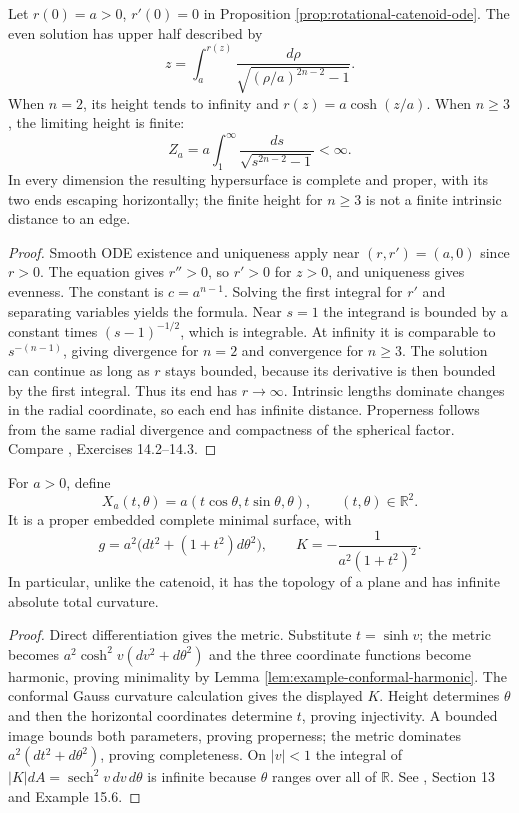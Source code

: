 \begin{example}\label{ex:higher-catenoid-height}
Let $r(0)=a>0$, $r'(0)=0$ in Proposition \ref{prop:rotational-catenoid-ode}. The even solution has upper half described by
\[
 z=\int_a^{r(z)}\frac{d\rho}{\sqrt{(\rho/a)^{2n-2}-1}}.
\]
When $n=2$, its height tends to infinity and $r(z)=a\cosh(z/a)$. When $n\geq3$, the limiting height is finite:
\[
 Z_a=a\int_1^\infty\frac{ds}{\sqrt{s^{2n-2}-1}}<\infty.
\]
In every dimension the resulting hypersurface is complete and proper, with its two ends escaping horizontally; the finite height for $n\geq3$ is not a finite intrinsic distance to an edge.
\end{example}
\begin{proof}
Smooth ODE existence and uniqueness apply near $(r,r')=(a,0)$ since $r>0$. The equation gives $r''>0$, so $r'>0$ for $z>0$, and uniqueness gives evenness. The constant is $c=a^{n-1}$. Solving the first integral for $r'$ and separating variables yields the formula. Near $s=1$ the integrand is bounded by a constant times $(s-1)^{-1/2}$, which is integrable. At infinity it is comparable to $s^{-(n-1)}$, giving divergence for $n=2$ and convergence for $n\geq3$. The solution can continue as long as $r$ stays bounded, because its derivative is then bounded by the first integral. Thus its end has $r\to\infty$. Intrinsic lengths dominate changes in the radial coordinate, so each end has infinite distance. Properness follows from the same radial divergence and compactness of the spherical factor. Compare \cite{ChMin}, Exercises 14.2--14.3.
\end{proof}

\begin{example}\label{ex:explicit-helicoid}
For $a>0$, define
\[
 X_a(t,\theta)=a(t\cos\theta,t\sin\theta,\theta),\qquad (t,\theta)\in\mathbb R^2.
\]
It is a proper embedded complete minimal surface, with
\[
 g=a^2\bigl(dt^2+(1+t^2)d\theta^2\bigr),\qquad
 K=-\frac1{a^2(1+t^2)^2}.
\]
In particular, unlike the catenoid, it has the topology of a plane and has infinite absolute total curvature.
\end{example}
\begin{proof}
Direct differentiation gives the metric. Substitute $t=\sinh v$; the metric becomes $a^2\cosh^2v(dv^2+d\theta^2)$ and the three coordinate functions become harmonic, proving minimality by Lemma \ref{lem:example-conformal-harmonic}. The conformal Gauss curvature calculation gives the displayed $K$. Height determines $\theta$ and then the horizontal coordinates determine $t$, proving injectivity. A bounded image bounds both parameters, proving properness; the metric dominates $a^2(dt^2+d\theta^2)$, proving completeness. On $|v|<1$ the integral of $|K|dA=\operatorname{sech}^2v\,dv\,d\theta$ is infinite because $\theta$ ranges over all of $\mathbb R$. See \cite{ChMin}, Section 13 and Example 15.6.
\end{proof}

